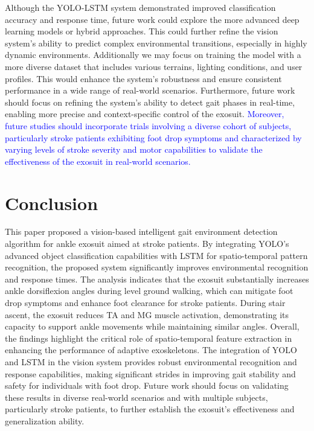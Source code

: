 \documentclass[journal,article,submit,pdftex,moreauthors]{Definitions/mdpi}
\begin{document}
Although the YOLO-LSTM system demonstrated improved classification accuracy and response time, future work could explore the more advanced deep learning models or hybrid approaches. This could further refine the vision system's ability to predict complex environmental transitions, especially in highly dynamic environments. Additionally we may focus on training the model with a more diverse dataset that includes various terrains, lighting conditions, and user profiles. This would enhance the system’s robustness and ensure consistent performance in a wide range of real-world scenarios. Furthermore, future work should focus on refining the system's ability to detect gait phases in real-time, enabling more precise and context-specific control of the exosuit. \textcolor{blue}{Moreover, future studies should incorporate trials involving a diverse cohort of subjects, particularly stroke patients exhibiting foot drop symptoms and characterized by varying levels of stroke severity and motor capabilities to validate the effectiveness of the exosuit in real-world scenarios.}


\section{Conclusion}
This paper proposed a vision-based intelligent gait environment detection algorithm for ankle exosuit aimed at stroke patients. By integrating YOLO's advanced object classification capabilities with LSTM for spatio-temporal pattern recognition, the proposed system significantly improves environmental recognition and response times. The analysis indicates that the exosuit substantially increases ankle dorsiflexion angles during level ground walking, which can mitigate foot drop symptoms and enhance foot clearance for stroke patients. During stair ascent, the exosuit reduces TA and MG muscle activation, demonstrating its capacity to support ankle movements while maintaining similar angles. Overall, the findings highlight the critical role of spatio-temporal feature extraction in enhancing the performance of adaptive exoskeletons. The integration of YOLO and LSTM in the vision system provides robust environmental recognition and response capabilities, making significant strides in improving gait stability and safety for individuals with foot drop. Future work should focus on validating these results in diverse real-world scenarios and with multiple subjects, particularly stroke patients, to further establish the exosuit's effectiveness and generalization ability. 
\end{document}
